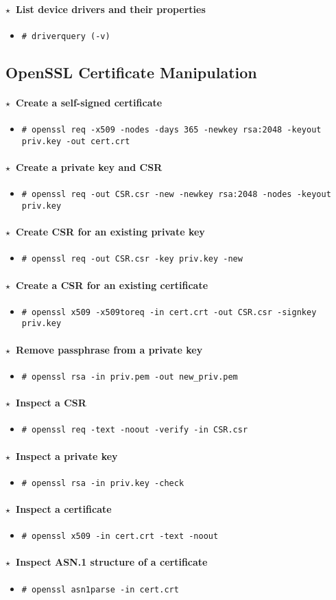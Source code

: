 \documentclass[10pt,landscape]{article}
\newcommand{\os}[1]{\texttt{\footnotesize{#1}}}
\newcommand{\unix}{\os{U}}
\newcommand{\windows}{\os{W}}
\newenvironment{action}[1]
  {\paragraph{$\star$~#1}\begin{itemize}[leftmargin=1cm]}
  {\end{itemize}}
\newcommand{\cmd}[2]{\item[#1] {\small\tt\# #2}}
\begin{document}
\begin{multicols*}{3}
\begin{action}{List device drivers and their properties}
\cmd{\windows}{driverquery (-v)}
\end{action}

\subsection*{OpenSSL Certificate Manipulation}

\begin{action}{Create a self-signed certificate}
    \cmd{\unix}{openssl req -x509 -nodes -days 365 -newkey rsa:2048 -keyout
    priv.key -out cert.crt}
\end{action}

\begin{action}{Create a private key and CSR}
    \cmd{\unix}{openssl req -out CSR.csr -new -newkey rsa:2048 -nodes -keyout
    priv.key}
\end{action}

\begin{action}{Create CSR for an existing private key}
    \cmd{\unix}{openssl req -out CSR.csr -key priv.key -new}
\end{action}

\begin{action}{Create a CSR for an existing certificate}
    \cmd{\unix}{openssl x509 -x509toreq -in cert.crt -out CSR.csr
    -signkey priv.key}
\end{action}

\begin{action}{Remove passphrase from a private key}
    \cmd{\unix}{openssl rsa -in priv.pem -out new\_priv.pem}
\end{action}

\begin{action}{Inspect a CSR}
    \cmd{\unix}{openssl req -text -noout -verify -in CSR.csr}
\end{action}

\begin{action}{Inspect a private key}
    \cmd{\unix}{openssl rsa -in priv.key -check}
\end{action}

\begin{action}{Inspect a certificate}
    \cmd{\unix}{openssl x509 -in cert.crt -text -noout}
\end{action}

\begin{action}{Inspect ASN.1 structure of a certificate}
    \cmd{\unix}{openssl asn1parse -in cert.crt}
\end{action}


\end{multicols*}
\end{document}
